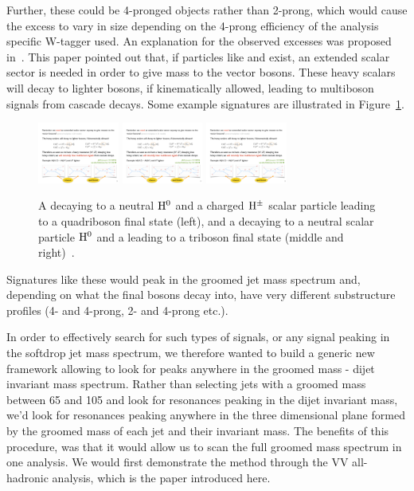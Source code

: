 Further, these could be 4-pronged objects rather than 2-prong, which would cause the excess to vary in size depending on the 4-prong efficiency of the analysis specific W-tagger used.\newline
An explanation for the observed excesses was proposed in~\cite{Aguilar-Saavedra:2018xpl}. This paper pointed out that, if particles like \PWpr and \PZpr exist, an extended scalar sector is needed in order to give mass to the
vector bosons. These heavy scalars will decay to lighter bosons, if kinematically allowed, leading to multiboson signals from cascade decays. Some example signatures are illustrated in Figure~\ref{fig:searchIII:tribosons}.
\begin{figure}[ht] 
    \centering
    \includegraphics[height=2cm]{figures/analysis/search3/misc/quadri.pdf}
    \includegraphics[height=2cm]{figures/analysis/search3/misc/tri1.pdf}
    \includegraphics[height=2cm]{figures/analysis/search3/misc/tri2.pdf}
    \caption{A \PWpr decaying to a neutral $\rm{H}^0$ and a charged $\rm{H}^{\pm}$ scalar particle leading to a quadriboson final state (left), and a \PWpr decaying to a neutral scalar particle $\rm{H}^0$ and a \PW leading to a triboson final state (middle and right)~\cite{Aguilar-Saavedra:2018xpl}.}
    \label{fig:searchIII:tribosons}
\end{figure}
Signatures like these would peak in the groomed jet mass spectrum and, depending on what the final bosons decay into, have very different substructure profiles (4- and 4-prong, 2- and 4-prong etc.).\par
In order to effectively search for such types of signals, or any signal peaking in the softdrop jet mass spectrum, we therefore wanted to build a generic new framework allowing to look for peaks anywhere in the groomed mass - dijet invariant mass spectrum.
Rather than selecting jets with a groomed mass between 65 and 105 \GeV and look for resonances peaking in the dijet invariant mass, we'd look for resonances peaking anywhere in the three dimensional plane formed by the groomed mass of each jet and their invariant mass.
The benefits of this procedure, was that it would allow us to scan the full groomed mass spectrum in one analysis. We would first demonstrate the method through the VV all-hadronic analysis, which is the paper introduced here.
